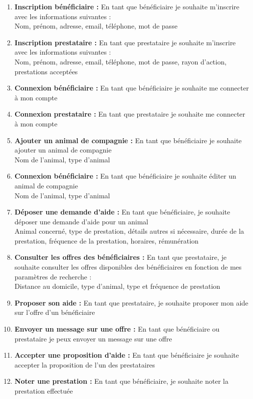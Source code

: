 \documentclass[conference]{IEEEtran}
\begin{document}
\begin{enumerate}
	\item \textbf{Inscription bénéficiaire :} En tant que bénéficiaire je souhaite m'inscrire avec les informations suivantes :
	\\Nom, prénom, adresse, email, téléphone, mot de passe
	\item \textbf{Inscription prestataire :} En tant que prestataire je souhaite m'inscrire avec les informations suivantes :
	\\Nom, prénom, adresse, email, téléphone, mot de passe, rayon d'action, prestations acceptées
	\item \textbf{Connexion bénéficiaire :} En tant que bénéficiaire je souhaite me connecter à mon compte
	\item \textbf{Connexion prestataire :} En tant que prestataire je souhaite me connecter à mon compte
	\item \textbf{Ajouter un animal de compagnie :} En tant que bénéficiaire je souhaite ajouter un animal de compagnie
	\\Nom de l'animal, type d'animal
	\item \textbf{Connexion bénéficiaire :} En tant que bénéficiaire je souhaite éditer un animal de compagnie
	\\Nom de l'animal, type d'animal
	\item \textbf{Déposer une demande d'aide :} En tant que bénéficiaire, je souhaite déposer une demande d'aide pour un animal
	\\Animal concerné, type de prestation, détails autres si nécessaire, durée de la prestation, fréquence de la prestation, horaires, rémunération
	\item \textbf{Consulter les offres des bénéficiaires :} En tant que prestataire, je souhaite consulter les offres disponibles des bénéficiaires en fonction de mes paramètres de recherche :
	\\Distance au domicile, type d'animal, type et fréquence de prestation
	\item \textbf{Proposer son aide :} En tant que prestataire, je souhaite proposer mon aide sur l'offre d'un bénéficiaire
	\item \textbf{Envoyer un message sur une offre :} En tant que bénéficiaire ou prestataire je peux envoyer un message sur une offre
	\item \textbf{Accepter une proposition d'aide :} En tant que bénéficiaire je souhaite accepter la proposition de l'un des prestataires
	\item \textbf{Noter une prestation :} En tant que bénéficiaire, je souhaite noter la prestation effectuée

\end{enumerate}
\end{document}
